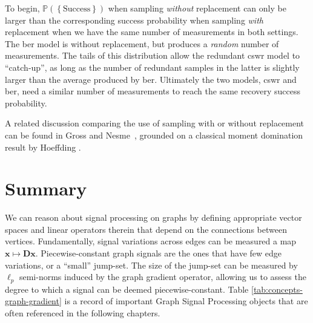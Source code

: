 To begin, $\mathbb{P} \left ( \left \{ \text{Success} \right \}\right )$ when sampling \emph{without} replacement can only be larger than the corresponding success probability when sampling \emph{with} replacement when we have the same number of measurements in both settings. The \acrshort{ber} model is without replacement, but produces a \emph{random} number of measurements. The tails of this distribution allow the redundant \acrshort{cswr} model to ``catch-up'', as long as the number of redundant samples in the latter is slightly larger than the average produced by \acrshort{ber}. Ultimately the two models, \acrshort{cswr} and \acrshort{ber}, need a similar number of measurements to reach the same recovery success probability.

A related discussion comparing the use of sampling with or without replacement can be found in Gross and Nesme~\cite{gross2010}, grounded on a classical moment domination result by Hoeffding \cite{hoeffding1963}.


\section{Summary}

We can reason about signal processing on graphs by defining appropriate vector spaces and linear operators therein that depend on the connections between vertices. Fundamentally, signal variations across edges can be measured a map $\mathbf{x} \mapsto \mathbf{Dx}$. Piecewise-constant graph signals are the ones that have few edge variations, or a ``small'' jump-set. The size of the jump-set can be measured by $\ell_p$ semi-norms induced by the graph gradient operator, allowing us to assess the degree to which a signal can be deemed piecewise-constant. Table \ref{tab:concepts-graph-gradient} is a record of important Graph Signal Processing objects that are often referenced in the following chapters.

